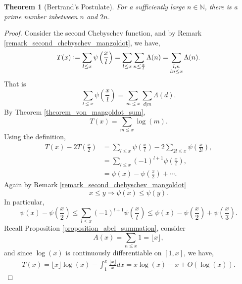 \documentclass{article}
\newtheorem{theorem}{Theorem} [section]
\newcommand{\defeq}{\vcentcolon=}
\newcommand{\N}[0]{\mathbb{N}}
\begin{document}
\begin{theorem}[Bertrand's Postulate]
  \label{theorem_bertrands_postulate}
  For a sufficiently large $n\in\N$, there is a prime number inbetween $n$ and $2n$.
\end{theorem}
\begin{proof}
  Consider the second Chebyschev function, and by Remark \ref{remark_second_chebyschev_mangoldot}, we have,
  \begin{equation*}
    T(x)\defeq \sum_{l\leq x}\psi\left({\frac x l}\right) = \sum_{l\leq x}\sum_{n\leq {\frac x l}}\Lambda(n) = \sum_{\substack{l,n\\ ln\leq x}}\Lambda(n).
  \end{equation*}
  That is 
  \begin{equation*}
    \sum_{l\leq x}\psi\left({\frac x l}\right) = \sum_{m\leq x}\sum_{d|m}\Lambda(d).
  \end{equation*}
  By Theorem \ref{theorem_von_mangoldot_sum}, 
  \begin{equation*}
    T(x) = \sum_{m\leq x}\log(m).
  \end{equation*}
    Using the definition,
  \begin{align*}
    T(x) - 2T\left({\frac x 2}\right) & = \sum_{l\leq x}\psi\left({\frac x l}\right)-2\sum_{2l\leq x}\psi\left({\frac x {2l}}\right),\\
    & = \sum_{l\leq x}(-1)^{l+1}\psi\left({\frac x l}\right),\\
    & = \psi(x) - \psi\left({\frac x 2}\right)+\cdots.
  \end{align*}
  Again by Remark \ref{remark_second_chebyschev_mangoldot}
  \begin{equation*}
     x\leq y\Rightarrow \psi(x)\leq \psi(y).
  \end{equation*}
  In particular, 
  \begin{equation*}
    \psi(x)-\psi\left({\frac x 2}\right) \leq \sum_{l\leq x}(-1)^{l+1}\psi\left({\frac x l}\right)\leq \psi(x)-\psi\left({\frac x 2}\right)+\psi\left({\frac x 3}\right).
  \end{equation*}
  Recall Proposition \ref{proposition_abel_summation}, consider 
  \begin{equation*}
    A(x) = \sum_{n\leq x}1 = \lfloor x\rfloor,
  \end{equation*}
  and since $\log(x)$ is continuously differentiable on $[1,x]$, we have,
  \begin{align*}
    T(x) = \lfloor x\rfloor\log(x) - \int_1^x{\frac {\lfloor x\rfloor} x}dx = x\log(x) - x+O(\log(x)).

\end{align*}
\end{proof}
\end{document}

